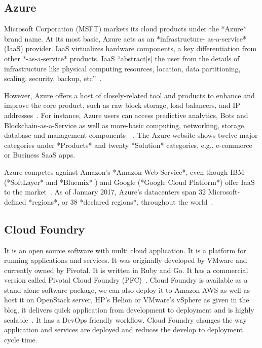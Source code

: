 \subsection{Azure}

Microsoft Corporation (MSFT) markets its cloud products under the
*Azure* brand name. At its most basic, Azure acts as an
*infrastructure- as-a-service* (IaaS) provider.  IaaS virtualizes
hardware components, a key differentiation from other *-as-a-service*
products. IaaS ``abstract[s] the user from the details of
infrastructure like physical computing resources, location, data
partitioning, scaling, security, backup,
etc''~\cite{www-wikipedia-cloud}.

However, Azure offers a host of closely-related tool and products to
enhance and improve the core product, such as raw block storage, load
balancers, and IP addresses~\cite{www-azure-msft}. For instance, Azure
users can access predictive analytics, Bots and
Blockchain-as-a-Service as well as more-basic computing, networking,
storage, database and management
components~\cite{www-sec-edgar-msft}~\cite{www-azure-msft}.  The Azure
website shows twelve major categories under *Products* and twenty
*Solution* categories, e.g., e-commerce or Business SaaS apps.

Azure competes against Amazon's *Amazon Web Service*, even though IBM
(*SoftLayer* and *Bluemix* ) and Google (*Google Cloud Platform*)
offer IaaS to the market~\cite{www-aws-amzn, www-softlayer-ibm,
  www-bluemix-ibm,www-cloud-google}.  As of January 2017, Azure's
datacenters span 32 Microsoft-defined *regions*, or 38 *declared
regions*, throughout the world~\cite{www-azure-msft}.

    \pv

\subsection{Cloud Foundry}

It is an open source software with multi cloud application. It is a
platform for running applications and services. It was originally
developed by VMware and currently owned by Pivotal. It is written in
Ruby and Go. It has a commercial version called Pivotal Cloud Foundry
(PFC)~\cite{www-cloudfoundry-book}. Cloud Foundry is available as a
stand alone software package, we can also deploy it to Amazon AWS as
well as host it on OpenStack server, HP’s Helion or VMware’s vSphere
as given in the blog, it delivers quick application from development
to deployment and is highly scalable~\cite{www-cloudfoundry-blog}. It
has a DevOps friendly workflow.  Cloud Foundry changes the way
application and services are deployed and reduces the develop to
deployment cycle time.

